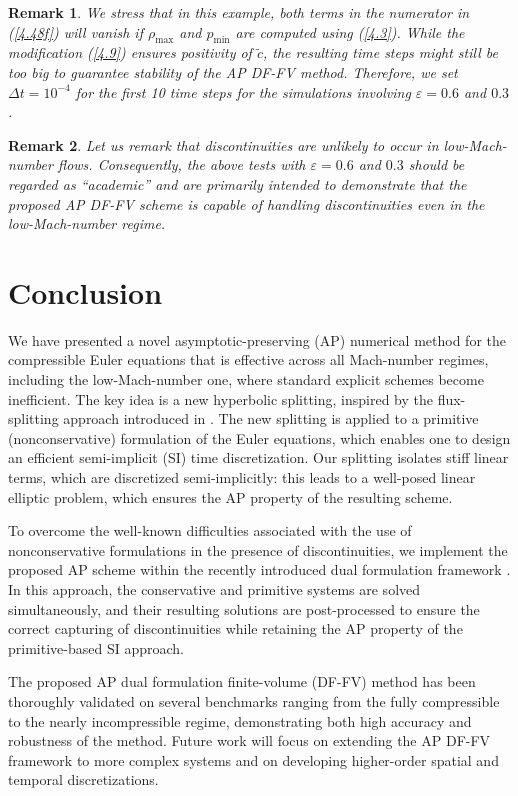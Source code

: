 \documentclass[A4paper,12pt,twoside]{article}
\newtheorem{remark}{Remark}[section]
\numberwithin{equation}{section}
\numberwithin{figure}{section}
\numberwithin{table}{section}
\newcommand{\dt}{\Delta t}
\newcommand{\ve}{\varepsilon}
\newcommand\eref[1]{(\ref{#1})}
\begin{document}
\begin{remark}
We stress that in this example, both terms in the numerator in \eref{4.48f} will vanish if $\rho_{\max}$ and $p_{\min}$ are computed using
\eref{4.3}. While the modification \eref{4.9} ensures positivity of $\tilde c$, the resulting time steps might still be too big to guarantee
stability of the AP DF-FV method. Therefore, we set $\dt=10^{-4}$ for the first 10 time steps for the simulations involving $\ve=0.6$ and
$0.3$.
\end{remark}
\begin{remark}
Let us remark that discontinuities are unlikely to occur in low-Mach-number flows. Consequently, the above tests with $\ve=0.6$ and $0.3$
should be regarded as ``academic'' and are primarily intended to demonstrate that the proposed AP DF-FV scheme is capable of handling
discontinuities even in the low-Mach-number regime.
\end{remark}

\section{Conclusion}\label{sec5}
We have presented a novel asymptotic-preserving (AP) numerical method for the compressible Euler equations that is effective across all
Mach-number regimes, including the low-Mach-number one, where standard explicit schemes become inefficient. The key idea is a new 
hyperbolic splitting, inspired by the flux-splitting approach introduced in \cite{haack2012all}. The new splitting is applied to a 
primitive (nonconservative) formulation of the Euler equations, which enables one to design an efficient semi-implicit (SI) time 
discretization. Our splitting isolates stiff linear terms, which are discretized semi-implicitly: this leads to a well-posed linear 
elliptic problem, which ensures the AP property of the resulting scheme.
	
To overcome the well-known difficulties associated with the use of nonconservative formulations in the presence of discontinuities, we
implement the proposed AP scheme within the recently introduced dual formulation framework \cite{CFKM,ACKM}. In this approach, the
conservative and primitive systems are solved simultaneously, and their resulting solutions are post-processed to ensure the correct
capturing of discontinuities while retaining the AP property of the primitive-based SI approach.
	
The proposed AP dual formulation finite-volume (DF-FV) method has been thoroughly validated on several benchmarks ranging from the fully
compressible to the nearly incompressible regime, demonstrating both high accuracy and robustness of the method. Future work will focus on
extending the AP DF-FV framework to more complex systems and on developing higher-order spatial and temporal discretizations.
	
\end{document}
